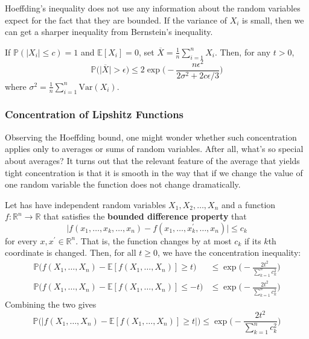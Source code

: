     Hoeffding's inequality does not use any information about the random variables expect for the fact that they are bounded. If the variance of $X_i$ is small, then we can get a sharper inequality from Bernstein's inequality. 

    \begin{theorem}
      If $\mathbb{P}(|X_i| \leq c) = 1$ and $\mathbb{E}[X_i] = 0$, set $\overline{X} = \frac{1}{n} \sum_{i=1}^n X_i$. Then, for any $t > 0$, 
      \begin{equation}
        \mathbb{P} \big( \big| \overline{X} \big| > \epsilon \big) \leq 2 \exp \bigg( - \frac{n \epsilon^2}{2 \sigma^2 + 2 c \epsilon /3} \bigg)
      \end{equation}
      where $\sigma^2 = \frac{1}{n} \sum_{i=1}^n \mathrm{Var}(X_i)$. 
    \end{theorem}

  \subsubsection{Concentration of Lipshitz Functions}

    Observing the Hoeffding bound, one might wonder whether such concentration applies only to averages or sums of random variables. After all, what's so special about averages? It turns out that the relevant feature of the average that yields tight concentration is that it is smooth in the way that if we change the value of one random variable the function does not change dramatically. 

    \begin{theorem}
      Let has have independent random variables $X_1, X_2, \ldots, X_n$ and a function $f: \mathbb{R}^n \longrightarrow \mathbb{R}$ that satisfies the \textbf{bounded difference property} that 
      \begin{equation}
        \big| f(x_1, \ldots, x_k, \ldots, x_n) - f(x_1, \ldots, x_k^\prime, \ldots, x_n) \big| \leq c_k
      \end{equation}
      for every $x, x^\prime \in \mathbb{R}^n$. That is, the function changes by at most $c_k$ if its $k$th coordinate is changed. Then, for all $t \geq 0$, we have the concentration inequality: 
      \begin{align*}
        \mathbb{P} \big( f(X_1, \ldots, X_n) - \mathbb{E}[ f(X_1, \ldots, X_n)] \geq t \big) & \leq \exp \bigg(- \frac{2t^2}{\sum_{k=1}^n c_k^2} \bigg) \\
        \mathbb{P} \big( f(X_1, \ldots, X_n) - \mathbb{E}[ f(X_1, \ldots, X_n)] \leq -t \big) & \leq \exp \bigg(- \frac{2t^2}{\sum_{k=1}^n c_k^2} \bigg)
      \end{align*}
      Combining the two gives 
      \[\mathbb{P} \big( \big| f(X_1, \ldots, X_n) - \mathbb{E}[ f(X_1, \ldots, X_n)] \geq t \big| \big) \leq \exp \bigg(- \frac{2t^2}{\sum_{k=1}^n c_k^2} \bigg)\]
    \end{theorem}

